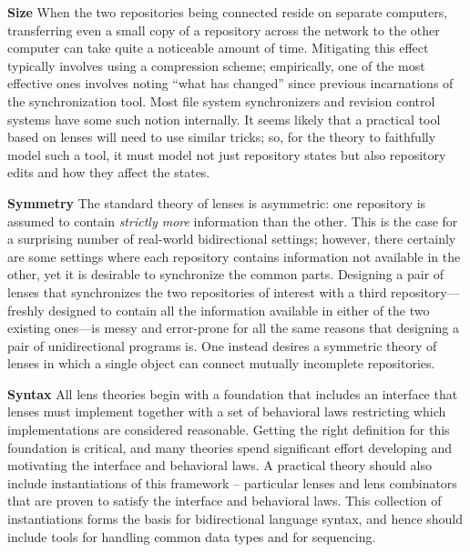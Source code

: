 \documentclass{article}
\begin{document}
{\bf Size} When the two repositories being connected reside on separate
computers, transferring even a small copy of a repository across the network
to the other computer can take quite a noticeable amount of time. Mitigating
this effect typically involves using a compression scheme; empirically, one
of the most effective ones involves noting ``what has changed'' since
previous incarnations of the synchronization tool. Most file system
synchronizers and revision control systems have some such notion internally.
It seems likely that a practical tool based on lenses will need to use
similar tricks; so, for the theory to faithfully model such a tool, it must
model not just repository states but also repository edits and how they
affect the states.

{\bf Symmetry} The standard theory of lenses is asymmetric: one repository
is assumed to contain \emph{strictly more} information than the other. This
is the case for a surprising number of real-world bidirectional settings;
however, there certainly are some settings where each repository contains
information not available in the other, yet it is desirable to synchronize
the common parts. Designing a pair of lenses that synchronizes the two
repositories of interest with a third repository---freshly designed to
contain all the information available in either of the two existing
ones---is messy and error-prone for all the same reasons that designing a
pair of unidirectional programs is. One instead desires a symmetric theory
of lenses in which a single object can connect mutually incomplete
repositories.

{\bf Syntax} All lens theories begin with a foundation that includes an
interface that lenses must implement together with a set of behavioral laws
restricting which implementations are considered reasonable. Getting the
right definition for this foundation is critical, and many theories spend
significant effort developing and motivating the interface and behavioral
laws. A practical theory should also include instantiations of this
framework -- particular lenses and lens combinators that are proven to
satisfy the interface and behavioral laws. This collection of instantiations
forms the basis for bidirectional language syntax, and hence should include
tools for handling common data types and for sequencing.
\end{document}
